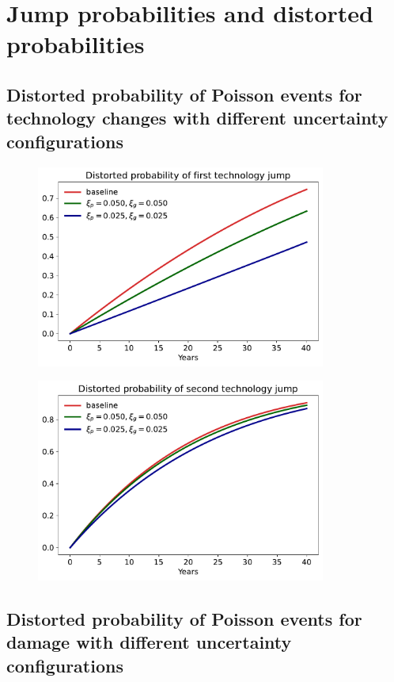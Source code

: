 \documentclass[11pt]{article}
\begin{document}
\section{Jump probabilities and distorted probabilities}

\subsection{Distorted probability of Poisson events for technology changes with different uncertainty configurations}


\begin{figure}[H]
	\centering
	\includegraphics[width=0.85\textwidth]{../figures/20damage/Tech_jump_first.pdf}
\end{figure}

\begin{figure}[H]
	\centering
	\includegraphics[width=0.85\textwidth]{../figures/20damage/Tech_jump_second.pdf}
\end{figure}

\subsection{Distorted probability of Poisson events for damage with different uncertainty configurations}
\end{document}
